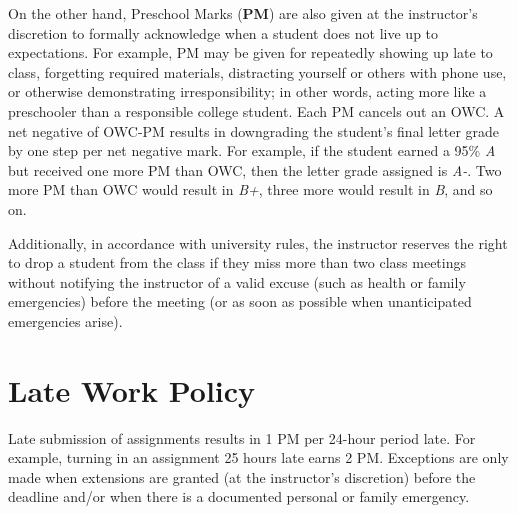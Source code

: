 \documentclass[12pt]{article}
\begin{document}
  On the other hand, Preschool Marks (\textbf{PM}) are also given at the instructor's discretion to formally acknowledge when a student does not live up to expectations. For example, PM may be given for repeatedly showing up late to class, forgetting required materials, distracting yourself or others with phone use, or otherwise demonstrating irresponsibility; in other words, acting more like a preschooler than a responsible college student. Each PM cancels out an OWC. A net negative of OWC-PM results in downgrading the student's final letter grade by one step per net negative mark. For example, if the student earned a 95\% \textit{A} but received one more PM than OWC, then the letter grade assigned is \textit{A-}. Two more PM than OWC would result in \textit{B+}, three more would result in \textit{B}, and so on.

  Additionally, in accordance with university rules, the instructor reserves the right to drop a student from the class if they miss more than two class meetings without notifying the instructor of a valid excuse (such as health or family emergencies) before the meeting (or as soon as possible when unanticipated emergencies arise).

  \section*{Late Work Policy}
  Late submission of assignments results in 1 PM per 24-hour period late. For example, turning in an assignment 25 hours late earns 2 PM. Exceptions are only made when extensions are granted (at the instructor's discretion) before the deadline and/or when there is a documented personal or family emergency.
\end{document}
